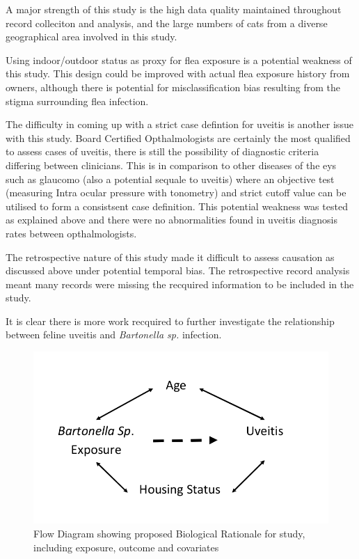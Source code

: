\documentclass[11pt,twocolumn]{article}
\begin{document}
		A major strength of this study is the high data quality maintained throughout record colleciton and analysis, and the large numbers of cats from a diverse geographical area involved in this study.



		Using indoor/outdoor status as proxy for flea exposure is a potential weakness of this study. 
		This design could be improved with actual flea exposure history from owners, although there is potential for misclassification bias resulting from the stigma surrounding flea infection.
		
		
		The difficulty in coming up with a strict case defintion for uveitis is another issue with this study. 
		Board Certified Opthalmologists are certainly the most qualified to assess cases of uveitis, there is still the possibility of diagnostic criteria differing between clinicians. 
		This is in comparison to other diseases of the eys such as glaucomo (also a potential sequale to uveitis) where an objective test (measuring Intra ocular pressure with tonometry) and strict cutoff value can be utilised to form a consistsent case definition.
		This potential weakness was tested as explained above and there were no abnormalities found in uveitis diagnosis rates between opthalmologists.


		The retrospective nature of this study made it difficult to assess causation as discussed above under potential temporal bias. The retrospective record analysis meant many records were missing the recquired information to be included in the study.

		
		It is clear there is more work recquired to further investigate the relationship between feline uveitis and \emph{Bartonella sp.} infection.
\newpage

\begin{figure}[h!]
	\centering
	\includegraphics[scale=0.3]{figure1.jpg}
	\caption{Flow Diagram showing proposed Biological Rationale for study, including exposure, outcome and covariates }
	\label{fig:1}
\end{figure}
\end{document}
